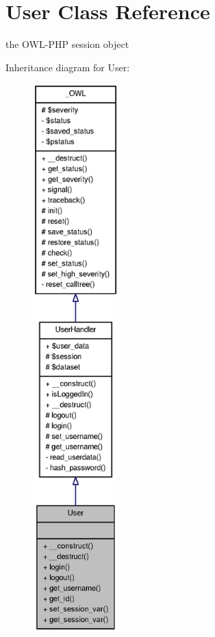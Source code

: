 \section{User Class Reference}
\label{classUser}


the OWL-\/PHP session object  




Inheritance diagram for User:\nopagebreak
\begin{figure}[H]
\begin{center}
\leavevmode
\includegraphics[height=600pt]{classUser__inherit__graph}
\end{center}
\end{figure}


